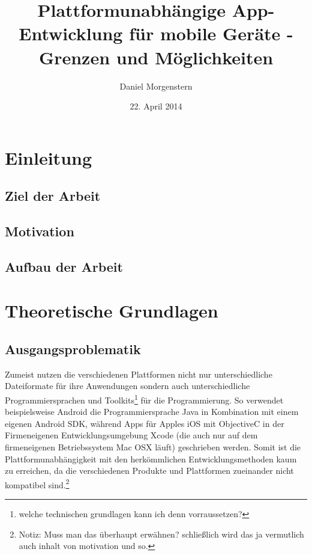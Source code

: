 \documentclass{article}
\title{Plattformunabh\"{a}ngige App-Entwicklung f\"{u}r mobile Ger\"{a}te - Grenzen und M\"{o}glichkeiten}
\author{Daniel Morgenstern}
\date{22. April 2014}
\begin{document}
   \maketitle
\section{Einleitung}
\subsection{Ziel der Arbeit}
\subsection{Motivation} %
\subsection{Aufbau der Arbeit} %
\section{Theoretische Grundlagen}

\subsection{Ausgangsproblematik}
Zumeist nutzen die verschiedenen Plattformen nicht nur unterschiedliche Dateiformate f\"{u}r ihre Anwendungen sondern auch unterschiedliche Programmiersprachen und Toolkits\footnote{welche technischen grundlagen kann ich denn vorraussetzen?} f\"{u}r die Programmierung. So verwendet beispielsweise Android die Programmiersprache Java in Kombination mit einem eigenen Android SDK, w\"{a}hrend Apps f\"{u}r Apples iOS mit ObjectiveC in der Firmeneigenen Entwicklungsumgebung Xcode (die auch nur auf dem firmeneigenen Betriebssystem Mac OSX l\"{a}uft) geschrieben werden. Somit ist die Plattformunabh\"{a}ngigkeit mit den herk\"{o}mmlichen Entwicklungsmethoden kaum zu erreichen, da die verschiedenen Produkte und Plattformen zueinander nicht kompatibel sind.\footnote{Notiz: Muss man das \"{u}berhaupt erw\"{a}hnen? schließlich wird das ja vermutlich auch inhalt von motivation und so.}
\end{document}
